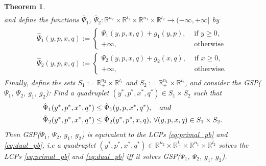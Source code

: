 \documentclass[a4paper,9pt]{extarticle}
\newtheorem{theorem}{Theorem}
\begin{document}
\begin{theorem}
\begin{equation}
\begin{split}
\end{split}
\end{equation}
and define the functions $\hat{\Psi}_1$, $\hat{\Psi}_2:
\mathbb{R}^{n_2} \times \mathbb{R}^{l_1} \times \mathbb{R}^{n_1}
\times \mathbb{R}^{l_2} \rightarrow (-\infty, +\infty]$ by
\begin{eqnarray}
  \begin{aligned}
    \hat{\Psi}_1(y, p, x, q) :=\begin{cases}
    \Psi_1(y, p, x, q)+ g_1(y, p), &\mbox{ if }y \ge 0,\\
    +\infty, &\mbox{ otherwise}\end{cases}\\
    \hat{\Psi}_2(y, p, x, q) :=\begin{cases}
    \Psi_2(y, p, x, q)+ g_2(x, q), &\mbox{ if }x \ge 0,\\
    +\infty, &\mbox{ otherwise.}\end{cases}
  \end{aligned}
\end{eqnarray}
Finally, define the sets $S_1 := \mathbb{R}^{n_2}_+ \times
\mathbb{R}^{l_1}$ and $S_2 := \mathbb{R}^{n_1}_+ \times
\mathbb{R}^{l_2}$, and consider the GSP($\Psi_1$, $\Psi_2$, $g_1$,
$g_2$): Find a quadruplet $(y^*,p^*, x^*, q^*) \in S_1 \times S_2$
such that
\begin{eqnarray}
  \begin{split}
    &\hat{\Psi}_1(y^*, p^*, x^*, q^*) \le \hat{\Psi}_1(y, p, x^*,
    q^*),\hspace{1em}and\\
    &\hat{\Psi}_2(y^*, p^*, x^*, q^*)
    \le \hat{\Psi}_2(y^*, p^*, x, q),\hspace{.21em} \forall (y,p, x, q)
    \in S_1 \times S_2.
  \label{eq:unconstrained_pb}
\end{split}
\end{eqnarray}
\label{thm:pd}
Then GSP($\Psi_1$,
  $\Psi_2$, $g_1$, $g_2$) is equivalent to the LCPs
  \eqref{eq:primal_pb} and \eqref{eq:dual_pb}, i.e
a quadruplet $(y^*,p^*, x^*, q^*) \in \mathbb{R}^{n_2}
  \times \mathbb{R}^{l_1} \times \mathbb{R}^{n_1} \times
  \mathbb{R}^{l_2}$ solves the LCPs
  \eqref{eq:primal_pb} and \eqref{eq:dual_pb} iff it solves
  GSP($\Psi_1$, $\Psi_2$, $g_1$, $g_2$). 
  \label{thm:pd}
\end{theorem}
\end{document}
